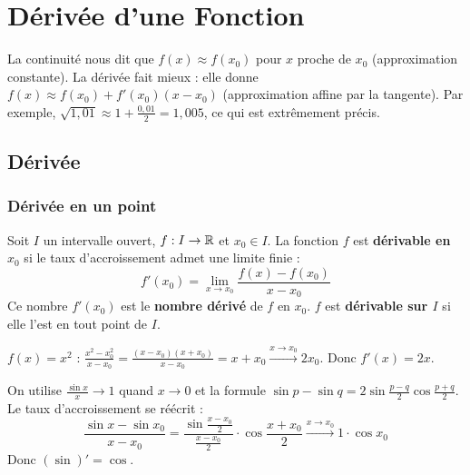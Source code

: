 \chapter{Dérivée d'une Fonction}

\begin{intuitionbox}[Motivation]
La continuité nous dit que $f(x) \approx f(x_0)$ pour $x$ proche de $x_0$ (approximation constante). La dérivée fait mieux : elle donne $f(x) \approx f(x_0) + f'(x_0)(x - x_0)$ (approximation affine par la tangente). Par exemple, $\sqrt{1{,}01} \approx 1 + \frac{0{,}01}{2} = 1{,}005$, ce qui est extrêmement précis.
\end{intuitionbox}


\section{Dérivée}

\subsection{Dérivée en un point}

\begin{defbox}[--- Dérivabilité]
Soit $I$ un intervalle ouvert, $f : I \to \mathbb{R}$ et $x_0 \in I$. La fonction $f$ est \textbf{dérivable en $x_0$} si le taux d'accroissement admet une limite finie :
\[f'(x_0) = \lim_{x \to x_0} \frac{f(x) - f(x_0)}{x - x_0}\]
Ce nombre $f'(x_0)$ est le \textbf{nombre dérivé} de $f$ en $x_0$. $f$ est \textbf{dérivable sur $I$} si elle l'est en tout point de $I$.
\end{defbox}

\begin{exbox}
$f(x) = x^2$ : $\displaystyle\frac{x^2 - x_0^2}{x - x_0} = \frac{(x - x_0)(x + x_0)}{x - x_0} = x + x_0 \xrightarrow{x \to x_0} 2x_0$. Donc $f'(x) = 2x$.
\end{exbox}

\begin{exbox}
On utilise $\frac{\sin x}{x} \to 1$ quand $x \to 0$ et la formule $\sin p - \sin q = 2\sin\frac{p-q}{2}\cos\frac{p+q}{2}$. Le taux d'accroissement se réécrit :
\[\frac{\sin x - \sin x_0}{x - x_0} = \frac{\sin\frac{x-x_0}{2}}{\frac{x-x_0}{2}} \cdot \cos\frac{x+x_0}{2} \xrightarrow{x \to x_0} 1 \cdot \cos x_0\]
Donc $(\sin)' = \cos$.
\end{exbox}


